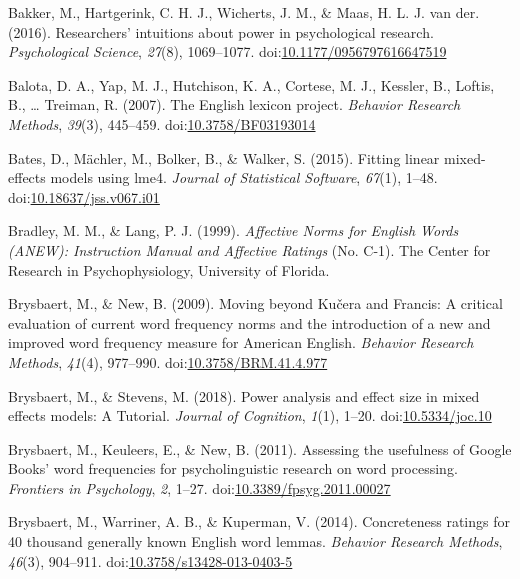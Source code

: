 \documentclass[english,man]{apa6}
\theoremstyle{definition}
\theoremstyle{definition}
\theoremstyle{definition}
\theoremstyle{remark}
\begin{document}
\hypertarget{ref-Bakker2016}{}
Bakker, M., Hartgerink, C. H. J., Wicherts, J. M., \& Maas, H. L. J. van
der. (2016). Researchers' intuitions about power in psychological
research. \emph{Psychological Science}, \emph{27}(8), 1069--1077.
doi:\href{https://doi.org/10.1177/0956797616647519}{10.1177/0956797616647519}

\hypertarget{ref-Balota2007}{}
Balota, D. A., Yap, M. J., Hutchison, K. A., Cortese, M. J., Kessler,
B., Loftis, B., \ldots{} Treiman, R. (2007). The English lexicon
project. \emph{Behavior Research Methods}, \emph{39}(3), 445--459.
doi:\href{https://doi.org/10.3758/BF03193014}{10.3758/BF03193014}

\hypertarget{ref-Bates2015}{}
Bates, D., Mächler, M., Bolker, B., \& Walker, S. (2015). Fitting linear
mixed-effects models using lme4. \emph{Journal of Statistical Software},
\emph{67}(1), 1--48.
doi:\href{https://doi.org/10.18637/jss.v067.i01}{10.18637/jss.v067.i01}

\hypertarget{ref-Bradley1999}{}
Bradley, M. M., \& Lang, P. J. (1999). \emph{Affective Norms for English
Words (ANEW): Instruction Manual and Affective Ratings} (No. C-1). The
Center for Research in Psychophysiology, University of Florida.

\hypertarget{ref-Brysbaert2009}{}
Brysbaert, M., \& New, B. (2009). Moving beyond Kučera and Francis: A
critical evaluation of current word frequency norms and the introduction
of a new and improved word frequency measure for American English.
\emph{Behavior Research Methods}, \emph{41}(4), 977--990.
doi:\href{https://doi.org/10.3758/BRM.41.4.977}{10.3758/BRM.41.4.977}

\hypertarget{ref-Brysbaert2018}{}
Brysbaert, M., \& Stevens, M. (2018). Power analysis and effect size in
mixed effects models: A Tutorial. \emph{Journal of Cognition},
\emph{1}(1), 1--20.
doi:\href{https://doi.org/10.5334/joc.10}{10.5334/joc.10}

\hypertarget{ref-Brysbaert2011}{}
Brysbaert, M., Keuleers, E., \& New, B. (2011). Assessing the usefulness
of Google Books' word frequencies for psycholinguistic research on word
processing. \emph{Frontiers in Psychology}, \emph{2}, 1--27.
doi:\href{https://doi.org/10.3389/fpsyg.2011.00027}{10.3389/fpsyg.2011.00027}

\hypertarget{ref-Brysbaert2013}{}
Brysbaert, M., Warriner, A. B., \& Kuperman, V. (2014). Concreteness
ratings for 40 thousand generally known English word lemmas.
\emph{Behavior Research Methods}, \emph{46}(3), 904--911.
doi:\href{https://doi.org/10.3758/s13428-013-0403-5}{10.3758/s13428-013-0403-5}
\end{document}
